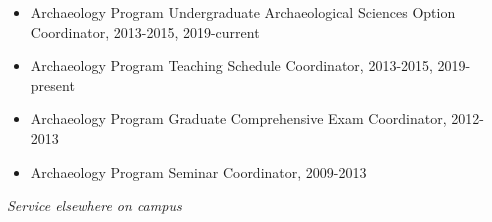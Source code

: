 \medskip

\begin{itemize}[noitemsep, font=$\bullet$\scshape\bfseries]

\item Archaeology Program Undergraduate Archaeological Sciences Option Coordinator, 2013-2015, 2019-current

\item Archaeology Program Teaching Schedule Coordinator, 2013-2015, 2019-present

\item Archaeology Program Graduate Comprehensive Exam Coordinator, 2012-2013

\item Archaeology Program Seminar Coordinator, 2009-2013

\end{itemize}

 \medskip
 
 \newpage

\noindent\emph{Service elsewhere on campus\vspace{0.01in}}

\medskip

